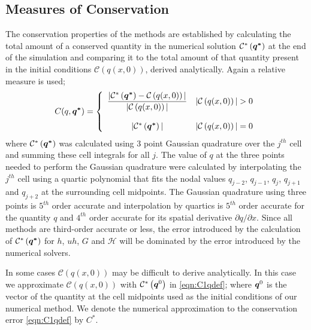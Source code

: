 \subsection{Measures of Conservation}
The conservation properties of the methods are established by calculating the total amount of a conserved quantity in the numerical solution $\mathcal{C}^*\left({\boldsymbol{q^*}}\right)$ at the end of the simulation and comparing it to the total amount of that quantity present in the initial conditions $\mathcal{C}\left({q(x,0)} \right)$, derived analytically. Again a relative measure is used;
\begin{equation}
C(q,\boldsymbol{q^*}) =  \left\lbrace \begin{array}{c r} 
\dfrac{|\mathcal{C}^*\left({\boldsymbol{q^*}}\right) - \mathcal{C}\left({q(x,0)} \right)| }{|\mathcal{C}\left({q(x,0)} \right)|} & |\mathcal{C}\left({q(x,0)} \right)| > 0 \\ \\
|\mathcal{C}^*\left({\boldsymbol{q^*}}\right)| & |\mathcal{C}\left({q(x,0)} \right)| = 0  \end{array}\right. 
\label{eqn:C1qdef} 
\end{equation}
where $\mathcal{C}^*\left({\boldsymbol{q^*}}\right)$ was calculated using 3 point Gaussian quadrature over the $j^{th}$ cell and summing these cell integrals for all $j$. The value of $q$ at the three points needed to perform the Gaussian quadrature were calculated by interpolating the $j^{th}$ cell using a quartic polynomial that fits the nodal values $q_{j-2}$, $q_{j-1}$, $q_{j}$, $q_{j+1}$ and $q_{j+2}$ at the surrounding cell midpoints. The Gaussian quadrature using three points is $5^{th}$ order accurate and interpolation by quartics is $5^{th}$ order accurate for the quantity $q$ and $4^{th}$ order accurate for its spatial derivative $\partial q /  \partial x$. Since all methods are third-order accurate or less, the error introduced by the calculation of $\mathcal{C}^*\left({\boldsymbol{q^*}}\right)$ for $h$, $uh$, $G$ and $\mathcal{H}$ will be dominated by the error introduced by the numerical solvers.

In some cases $\mathcal{C}\left({q(x,0)} \right)$ may be difficult to derive analytically. In this case we approximate $\mathcal{C}\left({q(x,0)} \right)$ with $\mathcal{C}^*\left(\boldsymbol{q}^0\right)$ in \eqref{eqn:C1qdef}; where $\boldsymbol{q}^0$ is the vector of the quantity at the cell midpoints used as the initial conditions of our numerical method. We denote the numerical approximation to the conservation error \eqref{eqn:C1qdef} by $C^*$.


